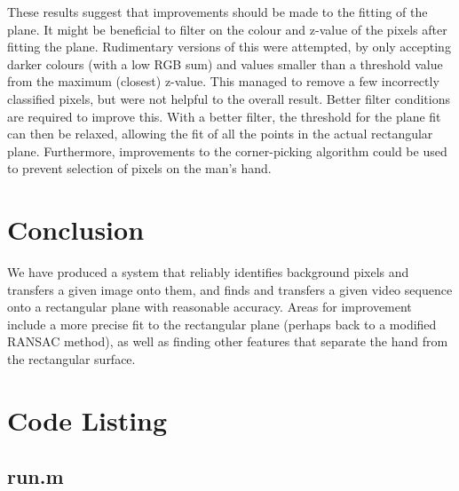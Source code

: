\documentclass[11pt]{article}
\begin{document}
These results suggest that improvements should be made to the fitting of the plane. It might be beneficial to filter on the colour and z-value of the pixels after fitting the plane. Rudimentary versions of this were attempted, by only accepting darker colours (with a low RGB sum) and values smaller than a threshold value from the maximum (closest) z-value. This managed to remove a few incorrectly classified pixels, but were not helpful to the overall result. Better filter conditions are required to improve this. With a better filter, the threshold for the plane fit can then be relaxed, allowing the fit of all the points in the actual rectangular plane. Furthermore, improvements to the corner-picking algorithm could be used to prevent selection of pixels on the man's hand.

\section{Conclusion}
We have produced a system that reliably identifies background pixels and transfers a given image onto them, and finds and transfers a given video sequence onto a rectangular plane with reasonable accuracy. Areas for improvement include a more precise fit to the rectangular plane (perhaps back to a modified RANSAC method), as well as finding other features that separate the hand from the rectangular surface.

\appendix

\newpage

\section{Code Listing}

\subsection{run.m}
\end{document}
